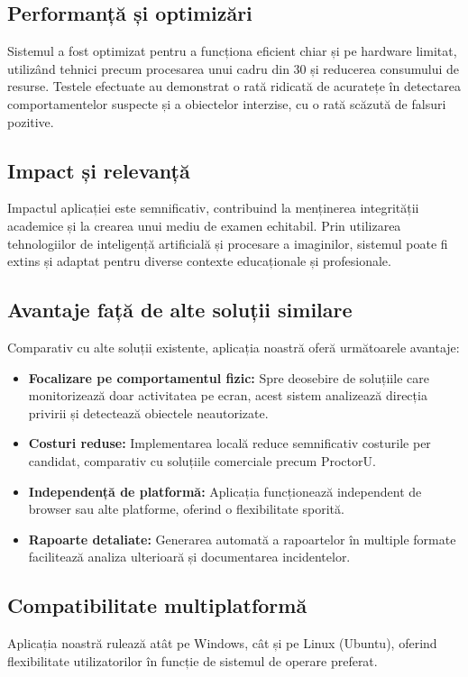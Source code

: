 \documentclass[12pt,a4paper]{article}
\begin{document}
\subsection{Performanță și optimizări}

Sistemul a fost optimizat pentru a funcționa eficient chiar și pe hardware limitat, utilizând tehnici precum procesarea unui cadru din 30 și reducerea consumului de resurse. Testele efectuate au demonstrat o rată ridicată de acuratețe în detectarea comportamentelor suspecte și a obiectelor interzise, cu o rată scăzută de falsuri pozitive.

\subsection{Impact și relevanță}

Impactul aplicației este semnificativ, contribuind la menținerea integrității academice și la crearea unui mediu de examen echitabil. Prin utilizarea tehnologiilor de inteligență artificială și procesare a imaginilor, sistemul poate fi extins și adaptat pentru diverse contexte educaționale și profesionale.

\subsection{Avantaje față de alte soluții similare}

Comparativ cu alte soluții existente, aplicația noastră oferă următoarele avantaje:
\begin{itemize}
    \item \textbf{Focalizare pe comportamentul fizic:} Spre deosebire de soluțiile care monitorizează doar activitatea pe ecran, acest sistem analizează direcția privirii și detectează obiectele neautorizate.
    \item \textbf{Costuri reduse:} Implementarea locală reduce semnificativ costurile per candidat, comparativ cu soluțiile comerciale precum ProctorU.
    \item \textbf{Independență de platformă:} Aplicația funcționează independent de browser sau alte platforme, oferind o flexibilitate sporită.
    \item \textbf{Rapoarte detaliate:} Generarea automată a rapoartelor în multiple formate facilitează analiza ulterioară și documentarea incidentelor.
\end{itemize}

\subsection{Compatibilitate multiplatformă}
Aplicația noastră rulează atât pe Windows, cât și pe Linux (Ubuntu), oferind flexibilitate utilizatorilor în funcție de sistemul de operare preferat. 
\end{document}
